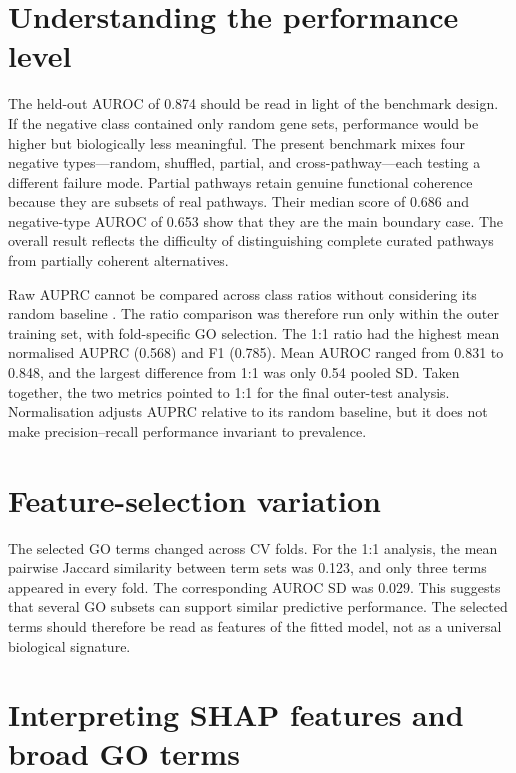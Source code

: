 \documentclass[12pt,letterpaper,oneside,openany]{book}
\begin{document}
\section{Understanding the performance level}
\label{sec:disc_performance}

The held-out AUROC of 0.874 should be read in light of the benchmark design. If the negative class contained only random gene sets, performance would be higher but biologically less meaningful. The present benchmark mixes four negative types---random, shuffled, partial, and cross-pathway---each testing a different failure mode. Partial pathways retain genuine functional coherence because they are subsets of real pathways. Their median score of 0.686 and negative-type AUROC of 0.653 show that they are the main boundary case. The overall result reflects the difficulty of distinguishing complete curated pathways from partially coherent alternatives.

Raw AUPRC cannot be compared across class ratios without considering its random baseline \citep{saito2015precision}. The ratio comparison was therefore run only within the outer training set, with fold-specific GO selection. The 1:1 ratio had the highest mean normalised AUPRC (0.568) and F1 (0.785). Mean AUROC ranged from 0.831 to 0.848, and the largest difference from 1:1 was only 0.54 pooled SD. Taken together, the two metrics pointed to 1:1 for the final outer-test analysis. Normalisation adjusts AUPRC relative to its random baseline, but it does not make precision--recall performance invariant to prevalence.

\section{Feature-selection variation}
\label{sec:disc_feature_variation}

The selected GO terms changed across CV folds. For the 1:1 analysis, the mean pairwise Jaccard similarity between term sets was 0.123, and only three terms appeared in every fold. The corresponding AUROC SD was 0.029. This suggests that several GO subsets can support similar predictive performance. The selected terms should therefore be read as features of the fitted model, not as a universal biological signature.

\section{Interpreting SHAP features and broad GO terms}
\label{sec:disc_shap_interpretation}
\end{document}
